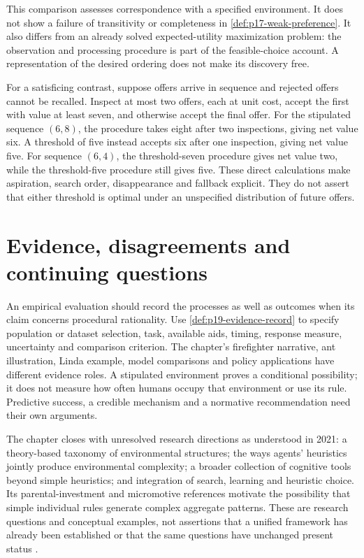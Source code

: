 This comparison assesses correspondence with a specified environment.
It does not show a failure of transitivity or completeness in
\cref{def:p17-weak-preference}. It also differs from an already solved
expected-utility maximization problem: the observation and processing
procedure is part of the feasible-choice account. A representation of
the desired ordering does not make its discovery free.

For a satisficing contrast, suppose offers arrive in sequence and rejected
offers cannot be recalled. Inspect at most two offers, each at unit cost,
accept the first with value at least seven, and otherwise accept the final
offer. For the stipulated sequence \((6,8)\), the procedure takes eight
after two inspections, giving net value six. A threshold of five instead
accepts six after one inspection, giving net value five. For sequence
\((6,4)\), the threshold-seven procedure gives net value two, while
the threshold-five procedure still gives five. These direct calculations
make aspiration, search order, disappearance and fallback explicit.
They do not assert that either threshold is optimal under an unspecified
distribution of future offers.

\section{Evidence, disagreements and continuing questions}
\label{sec:p17-br-evidence-limits}

An empirical evaluation should record the processes as well as outcomes
when its claim concerns procedural rationality. Use
\cref{def:p19-evidence-record} to specify population or dataset selection,
task, available aids, timing, response measure, uncertainty and comparison
criterion. The chapter's firefighter narrative, ant illustration, Linda
example, model comparisons and policy applications have different evidence
roles. A stipulated environment proves a conditional possibility; it does
not measure how often humans occupy that environment or use its rule.
Predictive success, a credible mechanism and a normative recommendation
need their own arguments.

The chapter closes with unresolved research directions as understood in
2021: a theory-based taxonomy of environmental structures; the ways agents'
heuristics jointly produce environmental complexity; a broader collection
of cognitive tools beyond simple heuristics; and integration of search,
learning and heuristic choice. Its parental-investment and micromotive
references motivate the possibility that simple individual rules generate
complex aggregate patterns. These are research questions and conceptual
examples, not assertions that a unified framework has already been
established or that the same questions have unchanged present status
\cite[p.~512]{HertwigKozyreva2021Bounded}.

